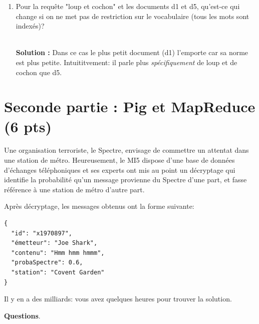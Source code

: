 \documentclass[11pt,a4paper]{article}
\newenvironment{solution}[0]{
~\\ \color{red} \textbf{Solution : }\color{black}}{%
}
\begin{document}
\begin{enumerate}
\begin{solution}
d6 obtient le même score que d1, mais l'emporte si on considère
l'idf de "mouton" qui est plus élevé  (6/3 en comptant d6) que celui de "loup"
(6/4 en comptant d6).
\end{solution}

   \item Pour la requête "loup et cochon" et les documents d1 et d5, 
   qu'est-ce qui change si on ne met pas de restriction 
   sur le vocabulaire (tous les mots sont indexés)?
   
\begin{solution}
Dans ce cas le plus petit document (d1) l'emporte car sa norme est
plus petite. Intuititvement: il parle plus \emph{spécifiquement} de
loup et de cochon que d5.
\end{solution}   
    
  \end{enumerate}

\section*{Seconde partie : Pig et MapReduce (6 pts)}

Une organisation terroriste, le Spectre, envisage de commettre un attentat
dans une station de métro. Heureusement, le MI5 dispose d'une base de données d'échanges
téléphoniques et ses experts ont mis au point un décryptage qui identifie
la probabilité qu'un message provienne du Spectre d'une part, et fasse
référence à une station de métro d'autre part.

Après décryptage, les messages obtenus ont la forme suivante:

\begin{verbatim}
{
  "id": "x1970897",
  "émetteur": "Joe Shark", 
  "contenu": "Hmm hmm hmmm",
  "probaSpectre": 0.6,
  "station": "Covent Garden"
}
\end{verbatim}

Il y en a des milliards: vous avez quelques heures pour trouver la solution.

\medskip
\textbf{Questions}.
\end{document}
